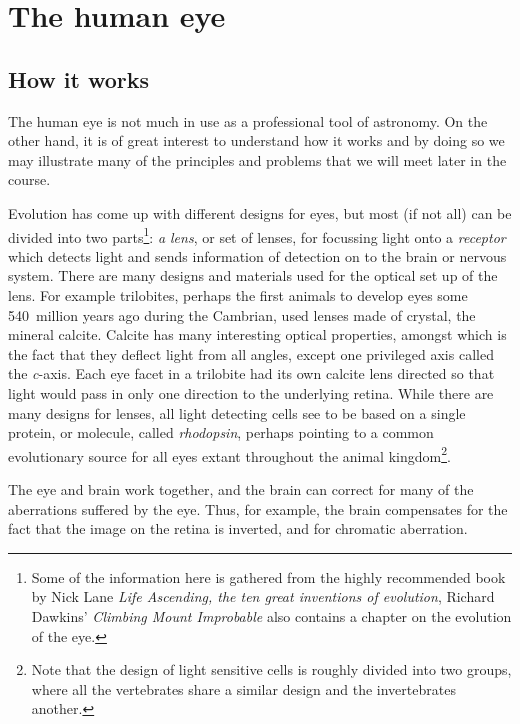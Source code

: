 \chapter{The human eye}
\section{How it works} %
The human eye is not much in use as a professional tool of
astronomy. On the other hand, it is of great interest to understand how it
works and by doing so we may illustrate many of the principles and
problems that we will meet later in the course.

Evolution has come up with different designs for eyes, but most (if
not all) can be divided into two parts\footnote{Some of the
  information here is gathered from the highly recommended book by
  Nick Lane {\it Life Ascending, the ten great inventions of
    evolution}, Richard Dawkins' {\it Climbing Mount
    Improbable} also contains a chapter on the evolution of the eye.}:
{\it a lens}, or set of lenses, for
focussing light onto a {\it receptor} which detects light and sends
information of detection on to the brain or nervous system. There are
many designs and materials used for the optical set up of the
lens. For example trilobites, perhaps the first animals to develop
eyes some 540~million years ago during the Cambrian, used lenses made
of crystal, the mineral calcite. Calcite has many interesting optical
properties, amongst which is the fact that they deflect light from all
angles, except one privileged axis called the {\it c}-axis. Each eye
facet in a trilobite had its own calcite lens directed so that light
would pass in only one direction to the underlying retina. While there
are many designs for lenses, all light detecting cells see to be based
on a single protein, or molecule, called {\it rhodopsin}, perhaps
pointing to a common evolutionary source for all eyes extant
throughout the animal kingdom\footnote{Note that the design
  of light sensitive cells is roughly divided into two groups, where
  all the vertebrates share a similar design and the invertebrates another.}.

The eye and brain work together, and the brain can correct for many of
the aberrations suffered by the eye. Thus, for example, the brain compensates for
the fact that the image on the retina is inverted, and for chromatic
aberration. 

